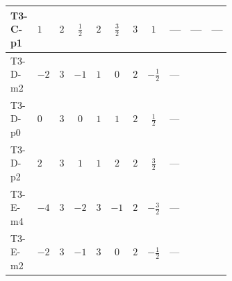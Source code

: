 \documentclass[8pt]{article}
\begin{document}
\begin{landscape}
\begin{longtable}{@{}llcccccc >{\raggedright\arraybackslash}p{0.21\linewidth} >{\raggedright\arraybackslash}p{0.21\linewidth} >{\raggedright\arraybackslash}p{0.21\linewidth}@{}}
T3-C-p1 & $1$ & $2$ & $\frac{1}{2}$ & $2$ & $\frac{3}{2}$ & $3$ & $1$ & --- & --- & --- \\
\midrule
T3-D-m2 & $-2$ & $3$ & $-1$ & $1$ & $0$ & $2$ & $-\frac{1}{2}$ & --- & \scriptsize\adjustbox{max width=\linewidth}{$\begin{gathered} -\frac{21 {g_2}^2 {\lambda_5}}{2}\end{gathered}$} & \scriptsize\adjustbox{max width=\linewidth}{$\begin{gathered} -\frac{9 {g_1}^2 {\lambda_5}}{2}\end{gathered}$} \\
\midrule
T3-D-p0 & $0$ & $3$ & $0$ & $1$ & $1$ & $2$ & $\frac{1}{2}$ & --- & \scriptsize\adjustbox{max width=\linewidth}{$\begin{gathered} -\frac{21 {g_2}^2 {\lambda_5}}{2}\end{gathered}$} & \scriptsize\adjustbox{max width=\linewidth}{$\begin{gathered} -\frac{9 {g_1}^2 {\lambda_5}}{2}\end{gathered}$} \\
\midrule
T3-D-p2 & $2$ & $3$ & $1$ & $1$ & $2$ & $2$ & $\frac{3}{2}$ & --- & \scriptsize\adjustbox{max width=\linewidth}{$\begin{gathered} -\frac{21 {g_2}^2 {\lambda_5}}{2}\end{gathered}$} & \scriptsize\adjustbox{max width=\linewidth}{$\begin{gathered} -\frac{33 {g_1}^2 {\lambda_5}}{2}\end{gathered}$} \\
\midrule
T3-E-m4 & $-4$ & $3$ & $-2$ & $3$ & $-1$ & $2$ & $-\frac{3}{2}$ & --- & \scriptsize\adjustbox{max width=\linewidth}{$\begin{gathered} -\frac{33 {g_2}^2 {\lambda_5}}{2}\end{gathered}$} & \scriptsize\adjustbox{max width=\linewidth}{$\begin{gathered} -\frac{33 {g_1}^2 {\lambda_5}}{2}\end{gathered}$} \\
\midrule
T3-E-m2 & $-2$ & $3$ & $-1$ & $3$ & $0$ & $2$ & $-\frac{1}{2}$ & --- & \scriptsize\adjustbox{max width=\linewidth}{$\begin{gathered} -\frac{33 {g_2}^2 {\lambda_5}}{2}\end{gathered}$} & \scriptsize\adjustbox{max width=\linewidth}{$\begin{gathered} -\frac{9 {g_1}^2 {\lambda_5}}{2}\end{gathered}$} \\

\end{longtable}
\end{landscape}
\end{document}
